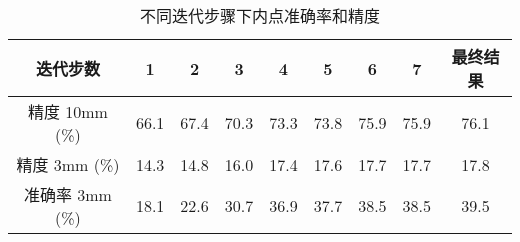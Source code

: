 \begin{table}[htbp]
  \centering
  \caption{不同迭代步骤下内点准确率和精度}
  \label{tab:ourlier_removal_metrics}
  \begin{tabular}{c|c|c|c|c|c|c|c|c}
    \toprule
    迭代步数 & 1 & 2 & 3 & 4 & 5 & 6 & 7 & 最终结果 \\
    \midrule
    精度 10mm (\%) & 66.1 &67.4 &70.3 &73.3 &73.8 &75.9 &75.9 &76.1\\
    精度 3mm (\%) & 14.3 &14.8 &16.0 &17.4 &17.6 &17.7 &17.7 &17.8\\
    准确率 3mm (\%)& 18.1 &22.6 &30.7 &36.9 &37.7 &38.5 &38.5 &39.5\\
    \bottomrule
  \end{tabular}
\end{table}
